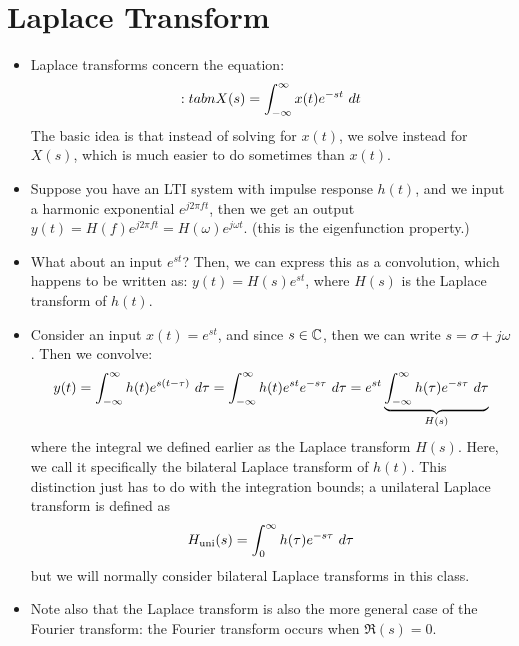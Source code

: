 \section{Laplace Transform}
\begin{itemize}
	\item Laplace transforms concern the equation:
		\[:tabn
		X(s) = \int_{-\infty}^{\infty} x(t) e^{-st} \ d t
		\] 
		The basic idea is that instead of solving for \( x(t) \), we solve instead for \( X(s) \), which is 
		much easier to do sometimes than \( x(t) \). 
	\item Suppose you have an LTI system with impulse response \( h(t) \), and we input a harmonic 
		exponential \( e^{j 2\pi ft} \), then we get an output \( y(t) = H(f) e^{j 2 \pi ft}
		= H(\omega) e^{j \omega t}\). (this is the 
		eigenfunction property.)
	\item What about an input \( e^{st} \)? Then, we can express this as a convolution, which 
		happens to be written as: \( y(t) = H(s) e^{st} \), where  \( H(s) \) is the Laplace transform of 
		\( h(t) \). 
	\item Consider an input \( x(t) = e^{st} \), and since \( s \in \mathbb C \), then we can write 
		\( s = \sigma + j \omega \). Then we convolve:
		\[
		y(t) = \int_{-\infty}^{\infty} h(t) e^{s(t - \tau)}\ d \tau = \int_{-\infty}^{\infty} 
		h(t) e^{st} e^{-s \tau}\ d \tau = e^{st}\underbrace{\int_{-\infty}^{\infty} h(\tau) e^{-s \tau}\ d \tau}
		_{H(s)}
		\] 
		where the integral we defined earlier as the Laplace transform \( H(s) \). Here, we call it 
		specifically the bilateral Laplace transform of \( h(t) \). This distinction just has to do with the 
		integration bounds; a unilateral Laplace transform is defined as 
		\[
		H_{\text{uni}}(s) = \int_{0}^{\infty} h(\tau)e^{-s \tau}\ d \tau 
		\] 
		but we will normally consider bilateral Laplace transforms in this class.  
	\item Note also that the Laplace transform is also the more general case of the Fourier transform: the Fourier
		transform occurs when \( \Re(s) = 0 \). 
\end{itemize}
